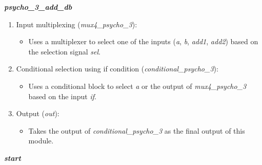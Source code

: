 \vspace{0.5cm}

\textbf{\textit{psycho\_3\_add\_db}}

\begin{enumerate}

\item Input multiplexing (\textit{mux4\_psycho\_3}):
\begin{itemize}
\item Uses a multiplexer to select one of the inputs (\textit{a}, \textit{b}, \textit{add1}, \textit{add2}) based on the selection signal \textit{sel}.
\end{itemize}

\item Conditional selection using if condition (\textit{conditional\_psycho\_3}):
\begin{itemize}
\item Uses a conditional block to select \textit{a} or the output of \textit{mux4\_psycho\_3} based on the input \textit{if}.
\end{itemize}

\item Output (\textit{out}):
\begin{itemize}
\item Takes the output of \textit{conditional\_psycho\_3} as the final output of this module.
\end{itemize}

\end{enumerate}

\vspace{0.5cm}

\textbf{\textit{start}}

